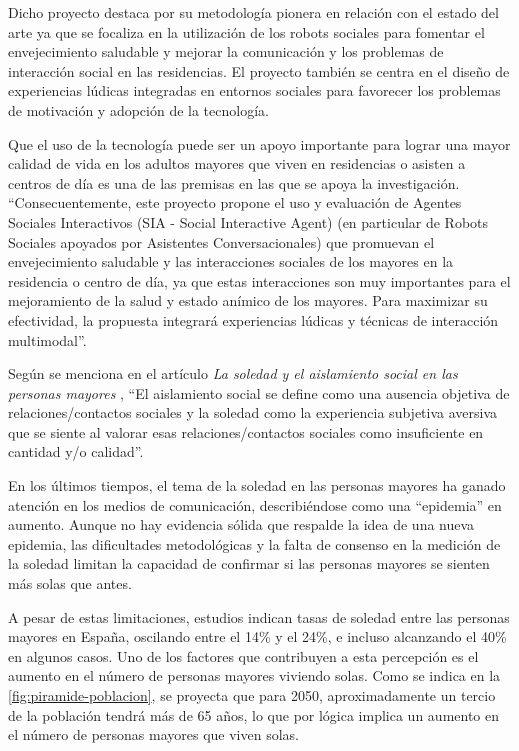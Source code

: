 Dicho proyecto destaca por su metodología pionera en relación con el estado del arte ya que se focaliza en la utilización de los robots sociales para fomentar el envejecimiento saludable y mejorar la comunicación y los problemas de interacción social en las residencias. El proyecto también se centra en el diseño de experiencias lúdicas integradas en entornos sociales para favorecer los problemas de motivación y adopción de la tecnología.

Que el uso de la tecnología puede ser un apoyo importante para lograr una mayor calidad de vida en los adultos mayores que viven en residencias o asisten a centros de día es una de las premisas en las que se apoya la investigación. \enquote{Consecuentemente, este proyecto propone el uso y evaluación de Agentes Sociales Interactivos (SIA - Social Interactive Agent) (en particular de Robots Sociales apoyados por Asistentes Conversacionales) que promuevan el envejecimiento saludable y las interacciones sociales de los mayores en la residencia o centro de día, ya que estas interacciones son muy importantes para el mejoramiento de la salud y estado anímico de los mayores. Para maximizar su efectividad, la propuesta integrará experiencias lúdicas y técnicas de interacción multimodal}.

Según se menciona en el artículo \textit{La soledad y el aislamiento social en las personas mayores} \parencite{ArruebarrenaCabaco2020}, \enquote{El aislamiento social se define como una ausencia objetiva de relaciones/contactos sociales y la soledad como la experiencia subjetiva aversiva que se siente al valorar esas relaciones/contactos sociales como
insuficiente en cantidad y/o calidad}.

En los últimos tiempos, el tema de la soledad en las personas mayores ha ganado atención en los medios de comunicación, describiéndose como una \enquote{epidemia} en aumento. Aunque no hay evidencia sólida que respalde la idea de una nueva epidemia, las dificultades metodológicas y la falta de consenso en la medición de la soledad limitan la capacidad de confirmar si las personas mayores se sienten más solas que antes.

A pesar de estas limitaciones, estudios indican tasas de soledad entre las personas mayores en España, oscilando entre el 14\% y el 24\%, e incluso alcanzando el 40\% en algunos casos. Uno de los factores que contribuyen a esta percepción es el aumento en el número de personas mayores viviendo solas. Como se indica en la \autoref{fig:piramide-poblacion}, se proyecta que para 2050, aproximadamente un tercio de la población tendrá más de 65 años, lo que por lógica implica un aumento en el número de personas mayores que viven solas.

